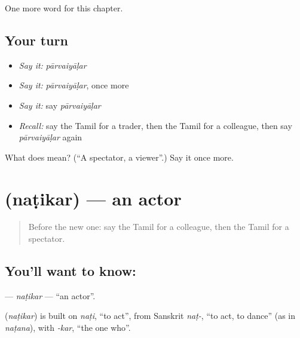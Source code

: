 \begin{grammarlens}[title={What you've built}]
One more word for this chapter.
\end{grammarlens}

\subsection*{Your turn}
\begin{itemize}
\raggedright
  \item \emph{Say it:} \emph{pārvaiyāḷar}
  \item \emph{Say it:} \emph{pārvaiyāḷar}, once more
  \item \emph{Say it:} say \emph{pārvaiyāḷar}
  \item \emph{Recall:} say the Tamil for a trader, then the Tamil for a colleague, then say \emph{pārvaiyāḷar} again
\end{itemize}

\begin{tcolorbox}[breakable,colback=teal!4,colframe=teal!35!black,title={Before you move on}]
What does  mean? (\textquotedblleft{}A spectator, a viewer\textquotedblright{}.) Say it once more.
\end{tcolorbox}
\section[\texorpdfstring{\ta{நடிகர்} (naṭikar)}{நடிகர் (naṭikar)}]{ (naṭikar) — an actor}

\label{lesson:TA-C193-natikar}



\begin{quote}
Before the new one: say the Tamil for a colleague, then the Tamil for a spectator.
\end{quote}

\subsection*{You'll want to know: }
\textbf{} — \emph{naṭikar} — \textquotedblleft{}an actor\textquotedblright{}.

\begin{cousinweb}
\textbf{} (\emph{naṭikar}) is built on \emph{naṭi}, \textquotedblleft{}to act\textquotedblright{}, from Sanskrit \emph{naṭ-}, \textquotedblleft{}to act, to dance\textquotedblright{} (as in \emph{naṭana}), with \emph{-kar}, \textquotedblleft{}the one who\textquotedblright{}.
\end{cousinweb}

